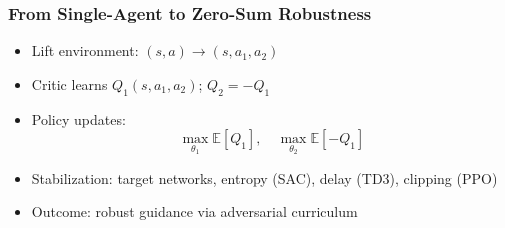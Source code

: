 \begin{frame}
    \frametitle{From Single-Agent to Zero-Sum Robustness}
    \small
    \begin{itemize}\setlength{\itemsep}{3pt}
        \item Lift environment: $(s,a)\rightarrow (s,a_1,a_2)$
        \item Critic learns $Q_1(s,a_1,a_2)$; $Q_2=-Q_1$
        \item Policy updates:
        \[
          \max_{\theta_1} \mathbb{E}[Q_1],\quad
          \max_{\theta_2} \mathbb{E}[-Q_1]
        \]
        \item Stabilization: target networks, entropy (SAC), delay (TD3), clipping (PPO)
        \item Outcome: robust guidance via adversarial curriculum
    \end{itemize}
\end{frame}